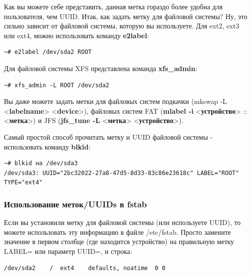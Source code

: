 \documentclass[10pt]{book}
\begin{document}
Как вы можете себе представить, данная метка гораздо более удобна для пользователя, чем UUID. Итак, как задать метку
для файловой системы? Ну, это сильно зависит от файловой системы, которую вы используете. Для ext2, ext3 или ext4, можно использовать команду \textbf{e2label}:

\begin{tcolorbox} 
\begin{lstlisting}
~# e2label /dev/sda2 ROOT
\end{lstlisting}
\end{tcolorbox}

Для файловой системы XFS представлена команда \textbf{xfs\_admin}: 

\begin{tcolorbox} 
\begin{lstlisting}
~# xfs_admin -L ROOT /dev/sda2
\end{lstlisting}
\end{tcolorbox}

Вы даже можете задать метки для файловых систем подкачки (mkswap -L <\textbf{labelname}> <\textbf{device}>), файловых систем FAT (\textbf{mlabel -i }<\textbf{устройство}> :: <\textbf{метка}>) и JFS (\textbf{jfs\_tune -L }<\textbf{метка}> <\textbf{устройство}>).

Самый простой способ прочитать метку и UUID файловой системы - использовать команду \textbf{blkid}:
\begin{tcolorbox} 
\begin{lstlisting}
~# blkid на /dev/sda3
/dev/sda3: UUID="2bc32022-27a8-47d5-8d33-83c86e23618c" LABEL="ROOT" TYPE="ext4"
\end{lstlisting}
\end{tcolorbox}

\subsubsection{Использование меток/UUIDs в fstab}

Если вы установили метку для файловой системы (или используете UUID), то можете использовать эту информацию в файле /etc/fstab. Просто замените значение в первом столбце (где находится устройство) на правильную метку LABEL= или параметр UUID=, и строка:
\begin{tcolorbox} 
\begin{lstlisting}
/dev/sda2    /  ext4    defaults, noatime  0 0
\end{lstlisting}
\end{tcolorbox}
\end{document}
